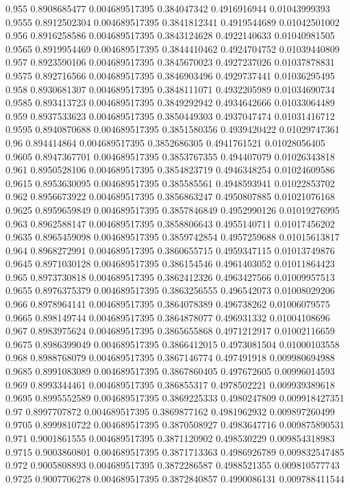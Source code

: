 {0.955 0.8908685477 0.004689517395 0.384047342 0.4916916944 0.01043999393
0.9555 0.8912502304 0.004689517395 0.3841812341 0.4919544689 0.01042501002
0.956 0.8916258586 0.004689517395 0.3843124628 0.4922140633 0.01040981505
0.9565 0.8919954469 0.004689517395 0.3844410462 0.4924704752 0.01039440809
0.957 0.8923590106 0.004689517395 0.3845670023 0.4927237026 0.01037878831
0.9575 0.892716566 0.004689517395 0.3846903496 0.4929737441 0.01036295495
0.958 0.8930681307 0.004689517395 0.3848111071 0.4932205989 0.01034690734
0.9585 0.893413723 0.004689517395 0.3849292942 0.4934642666 0.01033064489
0.959 0.8937533623 0.004689517395 0.3850449303 0.4937047474 0.01031416712
0.9595 0.8940870688 0.004689517395 0.3851580356 0.4939420422 0.01029747361
0.96 0.894414864 0.004689517395 0.3852686305 0.4941761521 0.01028056405
0.9605 0.8947367701 0.004689517395 0.3853767355 0.494407079 0.01026343818
0.961 0.8950528106 0.004689517395 0.3854823719 0.4946348254 0.01024609586
0.9615 0.8953630095 0.004689517395 0.385585561 0.4948593941 0.01022853702
0.962 0.8956673922 0.004689517395 0.3856863247 0.4950807885 0.01021076168
0.9625 0.8959659849 0.004689517395 0.3857846849 0.4952990126 0.01019276995
0.963 0.8962588147 0.004689517395 0.3858806643 0.4955140711 0.01017456202
0.9635 0.8965459098 0.004689517395 0.3859742854 0.4957259688 0.01015613817
0.964 0.8968272991 0.004689517395 0.3860655715 0.4959347115 0.01013749876
0.9645 0.8971030128 0.004689517395 0.386154546 0.4961403052 0.01011864423
0.965 0.8973730818 0.004689517395 0.3862412326 0.4963427566 0.01009957513
0.9655 0.8976375379 0.004689517395 0.3863256555 0.496542073 0.01008029206
0.966 0.8978964141 0.004689517395 0.3864078389 0.496738262 0.01006079575
0.9665 0.898149744 0.004689517395 0.3864878077 0.496931332 0.01004108696
0.967 0.8983975624 0.004689517395 0.3865655868 0.4971212917 0.01002116659
0.9675 0.8986399049 0.004689517395 0.3866412015 0.4973081504 0.01000103558
0.968 0.8988768079 0.004689517395 0.3867146774 0.497491918 0.009980694988
0.9685 0.8991083089 0.004689517395 0.3867860405 0.497672605 0.00996014593
0.969 0.8993344461 0.004689517395 0.386855317 0.4978502221 0.009939389618
0.9695 0.8995552589 0.004689517395 0.3869225333 0.4980247809 0.009918427351
0.97 0.8997707872 0.004689517395 0.3869877162 0.4981962932 0.009897260499
0.9705 0.8999810722 0.004689517395 0.3870508927 0.4983647716 0.009875890531
0.971 0.9001861555 0.004689517395 0.3871120902 0.498530229 0.009854318983
0.9715 0.9003860801 0.004689517395 0.3871713363 0.4986926789 0.009832547485
0.972 0.9005808893 0.004689517395 0.3872286587 0.4988521355 0.009810577743
0.9725 0.9007706278 0.004689517395 0.3872840857 0.4990086131 0.009788411544
}

